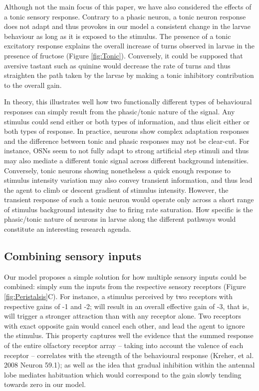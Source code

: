 \documentclass[11pt,a4paper]{article}
\begin{document}
Although not the main focus of this paper, we have also considered the effects of a tonic sensory response. Contrary to a phasic neuron, a tonic neuron response does not adapt and thus provokes in our model a consistent change in the larvae behaviour as long as it is exposed to the stimulus. The presence of a tonic excitatory response explains the overall increase of turns observed in larvae in the presence of fructose (Figure \ref{fig:Tonic}). Conversely, it could be supposed that aversive tastant such as quinine would decrease the rate of turns and thus straighten the path taken by the larvae by making a tonic inhibitory contribution to the overall gain. 

In theory, this illustrates well how two functionally different types of behavioural responses can simply result from the phasic/tonic nature of the signal. Any stimulus could send either or both types of information, and thus elicit either or both types of response. In practice, neurons show complex adaptation responses and the difference between tonic and phasic responses may not be clear-cut. For instance, OSNs seem to not fully adapt to strong artificial step stimuli \citep{nagel2011biophysical, schulze2015dynamical} and thus may also mediate a different tonic signal across different background intensities. Conversely, tonic neurons showing nonetheless a quick enough response to stimulus intensity variation may also convey transient information, and thus lead the agent to climb or descent gradient of stimulus intensity. However, the transient response of such a tonic neuron would operate only across a short range of stimulus background intensity due to firing rate saturation. How specific is the phasic/tonic nature of neurons in larvae along the different pathways would constitute an interesting research agenda.

\subsection{Combining sensory inputs}
Our model proposes a simple solution for how multiple sensory inputs could be combined: simply sum the inputs from the respective sensory receptors (Figure \ref{fig:Peristalsis}C). For instance, a stimulus perceived by two receptors with respective gains of -1 and -2; will result in an overall effective gain of -3, that is, will trigger a stronger attraction than with any receptor alone. Two receptors with exact opposite gain would cancel each other, and lead the agent to ignore the stimulus. This property captures well the evidence that the summed response of the entire olfactory receptor array – taking into account the valence of each receptor – correlates with the strength of the behavioural response (Kreher, et al. 2008 Neuron 59.1); as well as the idea that gradual inhibition within the antennal lobe mediates habituation \citep{das2011plasticity} which would correspond to the gain slowly tending towards zero in our model. 
\end{document}
